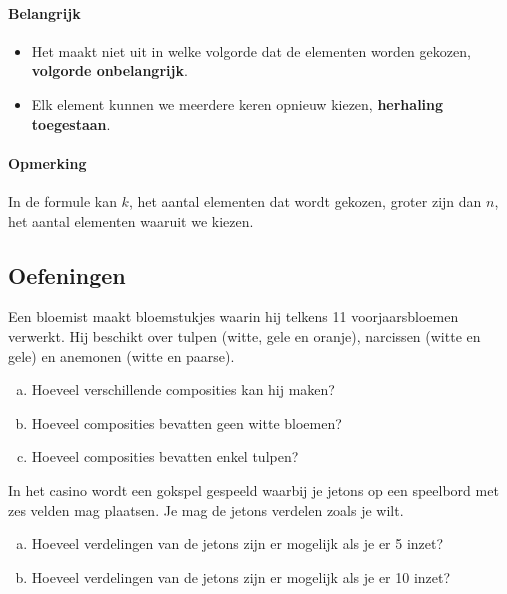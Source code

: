 \documentclass[12pt,a4,twoside]{article}
\begin{document}
\paragraph*{Belangrijk}
\begin{itemize}
  \item Het maakt niet uit in welke volgorde dat de elementen worden gekozen, {\bf volgorde onbelangrijk}.
  \item Elk element kunnen we meerdere keren opnieuw kiezen, {\bf herhaling toegestaan}.
\end{itemize}

\paragraph*{Opmerking}
In de formule kan $k$, het aantal elementen dat wordt gekozen, groter zijn dan $n$, het aantal elementen waaruit we kiezen.


\subsection{Oefeningen}



\begin{oefening}
Een bloemist maakt bloemstukjes waarin hij telkens 11 voorjaarsbloemen verwerkt. Hij beschikt over tulpen (witte, gele en oranje), narcissen (witte en gele) en anemonen (witte en paarse).
\begin{enumerate}[(a)]
  \item Hoeveel verschillende composities kan hij maken?
  \item Hoeveel composities bevatten geen witte bloemen?
  \item Hoeveel composities bevatten enkel tulpen?
\end{enumerate}
\end{oefening}

\begin{oefening}
In het casino wordt een gokspel gespeeld waarbij je jetons op een speelbord met zes velden mag plaatsen. Je mag de jetons verdelen zoals je wilt.
\begin{enumerate}[(a)]
  \item Hoeveel verdelingen van de jetons zijn er mogelijk als je er 5 inzet?
  \item Hoeveel verdelingen van de jetons zijn er mogelijk als je er 10 inzet?
\end{enumerate}
\end{oefening}
\end{document}

